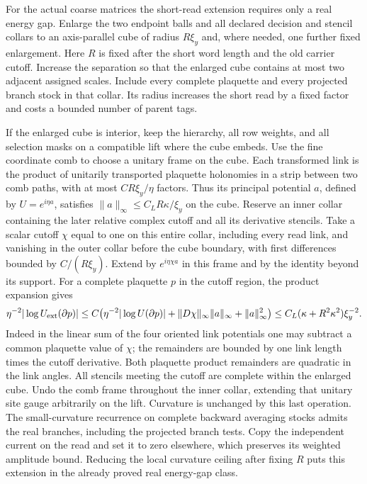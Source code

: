 \documentclass[11pt,letterpaper,reqno]{amsart}
\numberwithin{equation}{section}
\theoremstyle{definition}
\theoremstyle{remark}
\begin{document}
For the actual coarse matrices the short-read extension requires only
a real energy gap. Enlarge the two endpoint balls and all declared
decision and stencil collars to an axis-parallel cube of radius
\(R\xi_y\) and, where needed, one further fixed enlargement. Here
\(R\) is fixed after the short word length and the old carrier cutoff.
Increase the separation so that the enlarged cube contains at most
two adjacent assigned scales. Include every complete plaquette and
every projected branch stock in that collar. Its radius increases the
short read by a fixed factor and costs a bounded number of parent tags.

If the enlarged cube is interior, keep the hierarchy, all row weights,
and all selection masks on a compatible lift where the cube embeds.
Use the fine coordinate comb to choose a unitary frame on the cube.
Each transformed link is the product of unitarily transported
plaquette holonomies in a strip between two comb paths,
with at most \(C R\xi_y/\eta\) factors.
Thus its principal potential \(a\), defined by \(U=e^{i\eta a}\),
satisfies \(\|a\|_\infty\le C_L R\kappa/\xi_y\) on the cube.
Reserve an inner collar containing the later relative complex cutoff
and all its derivative stencils. Take a scalar cutoff \(\chi\)
equal to one on this entire collar, including every read link,
and vanishing in the outer collar before the cube boundary,
with first differences bounded by
\(C/(R\xi_y)\). Extend by \(e^{i\eta\chi a}\) in this frame and by
the identity beyond its support. For a complete plaquette \(p\) in
the cutoff region, the product expansion gives
\[
 \eta^{-2}|\log U_{\rm ext}(\partial p)|
 \le C\big(\eta^{-2}|\log U(\partial p)|
       +\|D\chi\|_\infty\|a\|_\infty+\|a\|_\infty^2\big)
 \le C_L(\kappa+R^2\kappa^2)\xi_y^{-2}.
\]
Indeed in the linear sum of the four oriented link potentials one may
subtract a common plaquette value of \(\chi\); the remainders are
bounded by one link length times the cutoff derivative. Both
plaquette product remainders are quadratic in the link angles.
All stencils meeting the cutoff are complete within the enlarged
cube. Undo the comb frame throughout the inner collar, extending that unitary site
gauge arbitrarily on the lift. Curvature is unchanged by this last
operation. The small-curvature recurrence on complete backward
averaging stocks admits the real branches, including the projected
branch tests. Copy the independent current on the read and set it
to zero elsewhere, which preserves its weighted amplitude bound.
Reducing the local curvature ceiling after fixing \(R\) puts this
extension in the already proved real energy-gap class.
\end{document}
